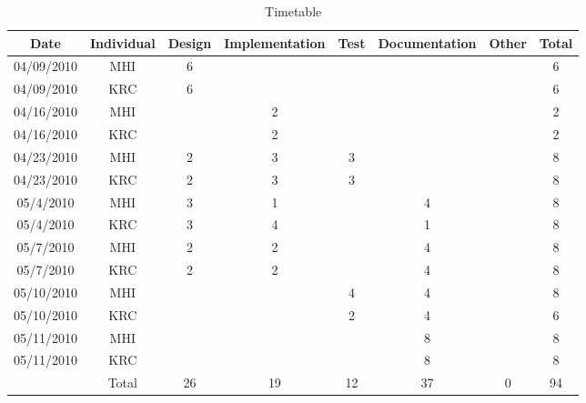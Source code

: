 \begin{table}
\begin{center}
\begin{tabular}{c|c|c|c|c|c|c|c}
Date & Individual & Design & Implementation & Test & Documentation & Other & Total\tabularnewline
\hline
\hline 
04/09/2010 & MHI & 6 &  &  &  &  & 6\tabularnewline
\hline 
04/09/2010 & KRC & 6 &  &  &  &  & 6\tabularnewline
\hline 
04/16/2010 & MHI &  & 2 &  &  &  & 2\tabularnewline
\hline 
04/16/2010 & KRC &  & 2 &  &  &  & 2\tabularnewline
\hline 
04/23/2010 & MHI & 2 & 3 & 3 &  &  & 8\tabularnewline
\hline 
04/23/2010 & KRC & 2 & 3 & 3 &  &  & 8\tabularnewline
\hline 
05/4/2010 & MHI & 3 & 1 &  & 4 &  & 8\tabularnewline
\hline 
05/4/2010 & KRC & 3 & 4 &  & 1 &  & 8\tabularnewline
\hline
05/7/2010 & MHI & 2 & 2 &  & 4 &  & 8\tabularnewline
\hline 
05/7/2010 & KRC & 2 & 2 &  & 4 &  & 8\tabularnewline
\hline
05/10/2010 & MHI &  &  & 4 &  4 &  & 8\tabularnewline
\hline 
05/10/2010 & KRC &  &  & 2 &  4 &  & 6\tabularnewline
\hline
05/11/2010 & MHI &  &  &  & 8 &  & 8\tabularnewline
\hline 
05/11/2010 & KRC &  &  &  & 8 &  & 8\tabularnewline
\hline

\hline 
 & Total & 26 & 19 & 12 & 37 & 0 & 94\tabularnewline
\cline{2-8} 
\end{tabular}
\caption{Timetable \label{table:timetable} }
\end{center}
\end{table}